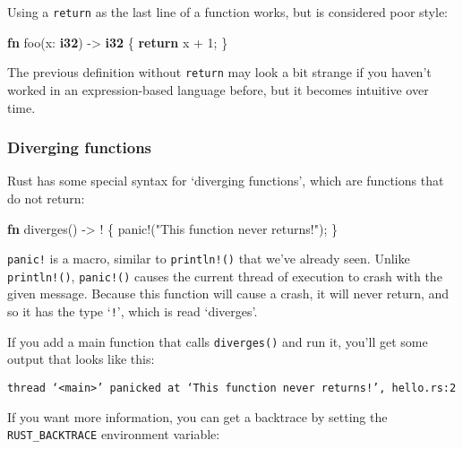 \documentclass[a4paper,]{book}
\newenvironment{Shaded}{\begin{snugshade}}{\end{snugshade}}
\newcommand{\KeywordTok}[1]{\textcolor[rgb]{0.13,0.29,0.53}{\textbf{{#1}}}}
\newcommand{\DecValTok}[1]{\textcolor[rgb]{0.00,0.00,0.81}{{#1}}}
\newcommand{\StringTok}[1]{\textcolor[rgb]{0.31,0.60,0.02}{{#1}}}
\newcommand{\OtherTok}[1]{\textcolor[rgb]{0.56,0.35,0.01}{{#1}}}
\newcommand{\NormalTok}[1]{{#1}}
\begin{document}
Using a \texttt{return} as the last line of a function works, but is
considered poor style:

\begin{Shaded}
\begin{Highlighting}[]
\KeywordTok{fn} \NormalTok{foo(x: }\KeywordTok{i32}\NormalTok{) -> }\KeywordTok{i32} \NormalTok{\{}
    \KeywordTok{return} \NormalTok{x + }\DecValTok{1}\NormalTok{;}
\NormalTok{\}}
\end{Highlighting}
\end{Shaded}

The previous definition without \texttt{return} may look a bit strange
if you haven't worked in an expression-based language before, but it
becomes intuitive over time.

\subsubsection{Diverging functions}\label{diverging-functions}

Rust has some special syntax for `diverging functions', which are
functions that do not return:

\begin{Shaded}
\begin{Highlighting}[]
\KeywordTok{fn} \NormalTok{diverges() -> ! \{}
    \OtherTok{panic!}\NormalTok{(}\StringTok{"This function never returns!"}\NormalTok{);}
\NormalTok{\}}
\end{Highlighting}
\end{Shaded}

\texttt{panic!} is a macro, similar to \texttt{println!()} that we've
already seen. Unlike \texttt{println!()}, \texttt{panic!()} causes the
current thread of execution to crash with the given message. Because
this function will cause a crash, it will never return, and so it has
the type `\texttt{!}', which is read `diverges'.

If you add a main function that calls \texttt{diverges()} and run it,
you'll get some output that looks like this:

\begin{verbatim}
thread ‘<main>’ panicked at ‘This function never returns!’, hello.rs:2
\end{verbatim}

If you want more information, you can get a backtrace by setting the
\texttt{RUST\_BACKTRACE} environment variable:
\end{document}
